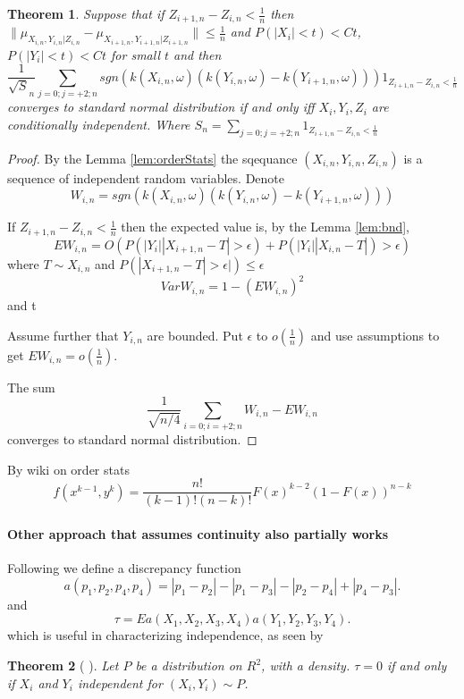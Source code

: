 \documentclass{article}
\newtheorem{Theorem}{Theorem}
\begin{document}
\begin{Theorem}
Suppose that if $Z_{i+1,n} - Z_{i,n} < \frac 1 n$ then $\| \mu_{X_{i,n},Y_{i,n}|Z_{i,n}} - \mu_{X_{i+1,n},Y_{i+1,n}|Z_{i+1,n}}  \| \leq \frac 1 n$ and $P(|X_i| <t) <Ct$,  $P( |Y_i| <t) <Ct$ for small $t$ and then
\[
 \frac{1}{\sqrt S_n} \sum_{j=0;j=+2;n}  sgn(k(X_{i,n}, \omega) ( k(Y_{i,n}, \omega) - k(Y_{i+1,n}, \omega))) 1_{Z_{i+1,n} - Z_{i,n} < \frac 1 n }  
\]
converges to standard normal distribution  if and only iff  $X_i,Y_i,Z_i$ are conditionally independent. Where $S_n = \sum_{j=0;j=+2;n} 1_{Z_{i+1,n} - Z_{i,n} < \frac 1 n }$
\end{Theorem}
\begin{proof}
By the Lemma \ref{lem:orderStats} the sqequance $(X_{i,n},Y_{i,n},Z_{i,n})$ is a sequence of independent random variables. Denote 
\[
W_{i,n}  = sgn(k(X_{i,n}, \omega) ( k(Y_{i,n}, \omega) - k(Y_{i+1,n}, \omega)))  
\]

If $Z_{i+1,n} - Z_{i,n} < \frac 1 n$ then the expected value is, by the Lemma \ref{lem:bnd},
\[
E W_{i,n} = O(P(|Y_i||X_{i+1,n} -T| > \epsilon) + P(|Y_i||X_{i,n}-T|) > \epsilon)  
\]
 where $T \sim X_{i,n}$ and $P(|X_{i+1,n} -T| > \epsilon|) \leq \epsilon $ 
\[
Var W_{i,n}= 1- (E W_{i,n})^2
\]
and t

Assume further that $Y_{i,n}$ are bounded. Put $\epsilon$ to $o(\frac 1 n) $ and use assumptions to get $ E W_{i,n} = o(\frac 1 n)$.

The sum 
\[
 \frac{1}{\sqrt {n/4}} \sum_{i=0;i=+2;n}  W_{i,n} - E W_{i,n}  
\]
converges to standard  normal distribution. 
\end{proof}









By wiki  on order stats
\[
 f(x^{k-1},y^k) = \frac{n!}{(k-1)! (n-k)!}F(x)^{k-2}(1-F(x))^{n-k}
\]



\paragraph{Other approach that assumes continuity also partially works}

Following \cite{bergsma2014consistent} we define a discrepancy function
\begin{equation}
a(p_1,p_2,p_4,p_4) = |p_1-p_2| -|p_1-p_3|-|p_2-p_4|+|p_4-p_3|.
\end{equation}
and 
\begin{equation}
\tau = Ea(X_1,X_2,X_3,X_4)a(Y_1,Y_2,Y_3,Y_4).
\end{equation}
which is useful in characterizing independence, as seen by 
\begin{Theorem}[\cite{bergsma2014consistent} ]
\label{th:tau_star}
Let $P$ be a distribution on $R^2$, with a density.  $\tau = 0$ if and only if $X_i$ and $Y_i$ independent for  $(X_i,Y_i) \sim P$. 
\end{Theorem}
\end{document}
